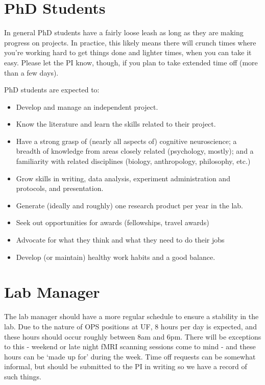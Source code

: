\documentclass[
  12pt,
]{book}
\begin{document}
\hypertarget{phd-students}{%
\section{PhD Students}\label{phd-students}}

In general PhD students have a fairly loose leash as long as they are making progress on projects. In practice, this likely means there will crunch times where you're working hard to get things done and lighter times, when you can take it easy. Please let the PI know, though, if you plan to take extended time off (more than a few days).

PhD students are expected to:

\begin{itemize}
\item
  Develop and manage an independent project.
\item
  Know the literature and learn the skills related to their project.
\item
  Have a strong grasp of (nearly all aspects of) cognitive neuroscience; a breadth of knowledge from areas closely related (psychology, mostly); and a familiarity with related disciplines (biology, anthropology, philosophy, etc.)
\item
  Grow skills in writing, data analysis, experiment administration and protocols, and presentation.
\item
  Generate (ideally and roughly) one research product per year in the lab.
\item
  Seek out opportunities for awards (fellowships, travel awards)
\item
  Advocate for what they think and what they need to do their jobs
\item
  Develop (or maintain) healthy work habits and a good balance.
\end{itemize}

\hypertarget{lab-manager}{%
\section{Lab Manager}\label{lab-manager}}

The lab manager should have a more regular schedule to ensure a stability in the lab. Due to the nature of OPS positions at UF, 8 hours per day is expected, and these hours should occur roughly between 8am and 6pm. There will be exceptions to this - weekend or late night fMRI scanning sessions come to mind - and these hours can be `made up for' during the week. Time off requests can be somewhat informal, but should be submitted to the PI in writing so we have a record of such things.
\end{document}

